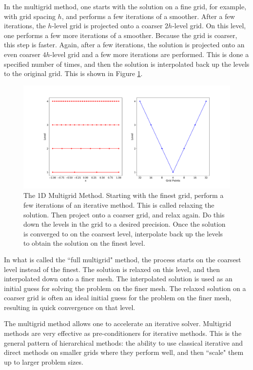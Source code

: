 In the multigrid method, one starts with the solution on a fine grid, for example, with grid spacing $h$, and performs a few iterations of a smoother. After a few iterations, the $h$-level grid is projected onto a coarser $2h$-level grid. On this level, one performs a few more iterations of a smoother. Because the grid is coarser, this step is faster. Again, after a few iterations, the solution is projected onto an even coarser $4h$-level grid and a few more iterations are performed. This is done a specified number of times, and then the solution is interpolated back up the levels to the original grid. This is shown in Figure \ref{fig:multigrid}.

\begin{figure}
    \centering
    \includegraphics[width=0.8\columnwidth]{figures/multigrid.pdf}
    \caption{The 1D Multigrid Method. Starting with the finest grid, perform a few iterations of an iterative method. This is called relaxing the solution. Then project onto a coarser grid, and relax again. Do this down the levels in the grid to a desired precision. Once the solution is converged to on the coarsest level, interpolate back up the levels to obtain the solution on the finest level.}
    \label{fig:multigrid}
\end{figure}

In what is called the ``full multigrid" method, the process starts on the coarsest level instead of the finest. The solution is relaxed on this level, and then interpolated down onto a finer mesh. The interpolated solution is used as an initial guess for solving the problem on the finer mesh. The relaxed solution on a coarser grid is often an ideal initial guess for the problem on the finer mesh, resulting in quick convergence on that level.

The multigrid method allows one to accelerate an iterative solver. Multigrid methods are very effective as pre-conditioners for iterative methods. This is the general pattern of hierarchical methods: the ability to use classical iterative and direct methods on smaller grids where they perform well, and then ``scale" them up to larger problem sizes.

